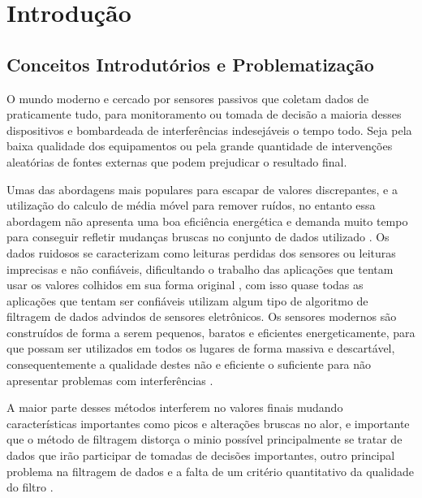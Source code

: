 
\chapter{Introdução}\label{intro}
\section{Conceitos Introdutórios e Problematização}

O mundo moderno e cercado por sensores passivos que coletam dados de praticamente tudo, para monitoramento ou tomada de decisão a maioria desses dispositivos e bombardeada de interferências indesejáveis o tempo todo. Seja pela baixa qualidade dos equipamentos ou pela grande quantidade de intervenções aleatórias de fontes externas que podem prejudicar o resultado final. 

Umas das abordagens mais populares para escapar de valores discrepantes, e a utilização do calculo de média móvel para remover ruídos, no entanto essa abordagem não apresenta uma boa eficiência energética e demanda muito tempo para conseguir refletir mudanças bruscas no conjunto de dados utilizado \cite{International_Conference__Zhuang}. 
Os dados ruidosos se caracterizam como leituras perdidas dos sensores ou leituras imprecisas e não confiáveis, dificultando o trabalho das aplicações que tentam usar os valores colhidos em sua forma original \cite{Jeffery_Pipelined_Framework}, com isso quase todas as aplicações que tentam ser confiáveis utilizam algum tipo de algoritmo de filtragem de dados advindos de sensores eletrônicos.
Os sensores modernos são construídos de forma a serem pequenos, baratos e eficientes energeticamente, para que possam ser utilizados em todos os lugares de forma massiva e descartável, consequentemente a qualidade destes não e eficiente o suficiente para não apresentar problemas com interferências \cite{tan2005sensoclean}.


A maior parte desses métodos interferem no valores finais mudando características importantes como picos e alterações bruscas no alor, e importante que o método de filtragem distorça o minio possível principalmente se tratar de dados que irão participar de tomadas de decisões importantes, outro principal problema na filtragem de dados e a falta de um critério quantitativo da qualidade do filtro \cite{kalambet2011noise}.



